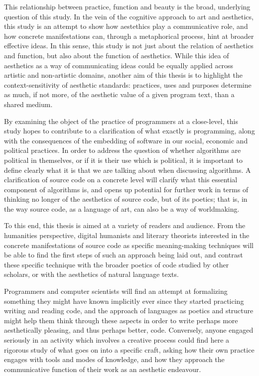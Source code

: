 This relationship between practice, function and beauty is the broad, underlying question of this study. In the vein of the cognitive approach to art and aesthetics, this study is an attempt to show how aestethics play a communicative role, and how concrete manifestations can, through a metaphorical process, hint at broader effective ideas. In this sense, this study is not just about the relation of aesthetics and function, but also about the function of aesthetics. While this idea of aesthetics as a way of communicating ideas could be equally applied across artistic and non-artistic domains, another aim of this thesis is to highlight the context-sensitivity of aesthetic standards: practices, uses and purposes determine as much, if not more, of the aesthetic value of a given program text, than a shared medium.

By examining the object of the practice of programmers at a close-level, this study hopes to contribute to a clarification of what exactly is programming, along with the consequences of the embedding of software in our social, economic and political practices. In order to address the question of whether algorithms are political in themselves, or if it is their use which is political, it is important to define clearly what it is that we are talking about when discussing algorithms. A clarification of source code on a concrete level will clarify what this essential component of algorithms is, and opens up potential for further work in terms of thinking no longer of the aesthetics of source code, but of its poetics; that is, in the way source code, as a language of art, can also be a way of worldmaking.

To this end, this thesis is aimed at a variety of readers and audience. From the humanities perspective, digital humanists and literary theorists interested in the concrete manifestations of source code as specific meaning-making techniques will be able to find the first steps of such an approach being laid out, and contrast these specific technique with the broader poetics of code studied by other scholars, or with the aesthetics of natural language texts.

Programmers and computer scientists will find an attempt at formalizing something they might have known implicitly ever since they started practicing writing and reading code, and the approach of languages as poetics and structure might help them think through these aspects in order to write perhaps more aesthetically pleasing, and thus perhaps better, code. Conversely, anyone engaged seriously in an activity which involves a creative process could find here a rigorous study of what goes on into a specific craft, asking how their own practice engages with tools and modes of knowledge, and how they approach the communicative function of their work as an aesthetic endeavour.

